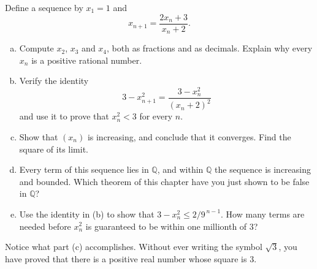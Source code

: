 \begin{problem}
Define a sequence by $x_1 = 1$ and
\[ x_{n+1} = \frac{2x_n + 3}{x_n + 2}. \]
\begin{enumerate}[(a)]
	\item Compute $x_2$, $x_3$ and $x_4$, both as fractions and as decimals.  Explain why every $x_n$ is a positive rational number.
	\item Verify the identity
	\[ 3 - x_{n+1}^2 = \frac{3 - x_n^2}{(x_n + 2)^2} \]
	and use it to prove that $x_n^2 < 3$ for every $n$.
	\item Show that $(x_n)$ is increasing, and conclude that it converges.  Find the square of its limit.
	\item Every term of this sequence lies in $\mathbb{Q}$, and within $\mathbb{Q}$ the sequence is increasing and bounded.  Which theorem of this chapter have you just shown to be false in $\mathbb{Q}$?
	\item Use the identity in (b) to show that $3 - x_n^2 \leq 2/9^{\,n-1}$.  How many terms are needed before $x_n^2$ is guaranteed to be within one millionth of $3$?
\end{enumerate}
Notice what part (c) accomplishes.  Without ever writing the symbol $\sqrt{3}$, you have proved that there is a positive real number whose square is $3$.
\end{problem}

